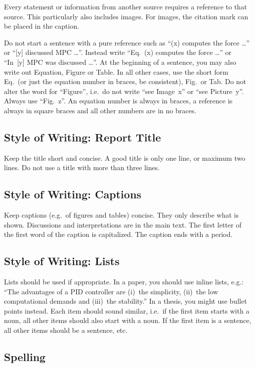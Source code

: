 \documentclass[journal]{IEEEtran}
\begin{document}
Every statement or information from another source requires a reference to that source. This particularly also includes images. For images, the citation mark can be placed in the caption.

Do not start a sentence with a pure reference such as “(x) computes the force \dots” or “[y] discussed MPC \dots”. Instead write “Eq.~(x) computes the force \dots” or “In~[y] MPC was discussed \dots”. At the beginning of a sentence, you may also write out Equation, Figure or Table. In all other cases, use the short form Eq.\ (or just the equation number in braces, be consistent), Fig.\ or Tab. Do not alter the word for “Figure”, i.e.\ do not write “see Image~x” or “see Picture~y”. Always use “Fig.~z”. An equation number is always in braces, a reference is always in square braces and all other numbers are in no braces.

\subsection{Style of Writing: Report Title}

Keep the title short and concise. A good title is only one line, or maximum two lines. Do not use a title with more than three lines.

\subsection{Style of Writing: Captions}

Keep captions (e.g.\ of figures and tables) concise. They only describe what is shown. Discussions and interpretations are in the main text. The first letter of the first word of the caption is capitalized. The caption ends with a period.

\subsection{Style of Writing: Lists}

Lists should be used if appropriate. In a paper, you should use inline lists, e.g.: “The advantages of a PID controller are (i)~the simplicity, (ii)~the low computational demands and (iii)~the stability.” In a thesis, you might use bullet points instead. Each item should sound similar, i.e.\ if the first item starts with a noun, all other items should also start with a noun. If the first item is a sentence, all other items should be a sentence, etc.

\subsection{Spelling}
\end{document}
